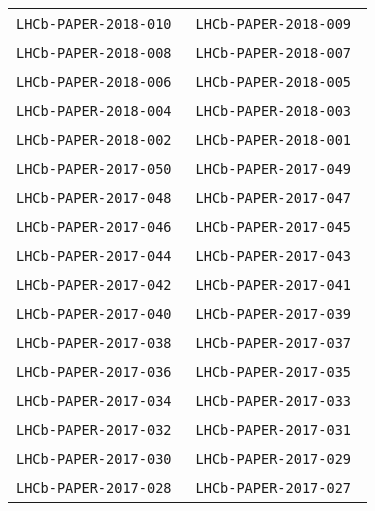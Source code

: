 \begin{center}
\begin{longtable}{ll}
\texttt{LHCb-PAPER-2018-010}~\cite{LHCb-PAPER-2018-010}  &
\texttt{LHCb-PAPER-2018-009}~\cite{LHCb-PAPER-2018-009} \\
\texttt{LHCb-PAPER-2018-008}~\cite{LHCb-PAPER-2018-008}  &
\texttt{LHCb-PAPER-2018-007}~\cite{LHCb-PAPER-2018-007} \\
\texttt{LHCb-PAPER-2018-006}~\cite{LHCb-PAPER-2018-006}  &
\texttt{LHCb-PAPER-2018-005}~\cite{LHCb-PAPER-2018-005} \\
\texttt{LHCb-PAPER-2018-004}~\cite{LHCb-PAPER-2018-004} &
\texttt{LHCb-PAPER-2018-003}~\cite{LHCb-PAPER-2018-003} \\
\texttt{LHCb-PAPER-2018-002}~\cite{LHCb-PAPER-2018-002} &
\texttt{LHCb-PAPER-2018-001}~\cite{LHCb-PAPER-2018-001} \\
\hline
\texttt{LHCb-PAPER-2017-050}~\cite{LHCb-PAPER-2017-050} &
\texttt{LHCb-PAPER-2017-049}~\cite{LHCb-PAPER-2017-049} \\
\texttt{LHCb-PAPER-2017-048}~\cite{LHCb-PAPER-2017-048} &
\texttt{LHCb-PAPER-2017-047}~\cite{LHCb-PAPER-2017-047} \\
\texttt{LHCb-PAPER-2017-046}~\cite{LHCb-PAPER-2017-046} &
\texttt{LHCb-PAPER-2017-045}~\cite{LHCb-PAPER-2017-045} \\
\texttt{LHCb-PAPER-2017-044}~\cite{LHCb-PAPER-2017-044} &
\texttt{LHCb-PAPER-2017-043}~\cite{LHCb-PAPER-2017-043} \\
\texttt{LHCb-PAPER-2017-042}~\cite{LHCb-PAPER-2017-042} &
\texttt{LHCb-PAPER-2017-041}~\cite{LHCb-PAPER-2017-041} \\
\texttt{LHCb-PAPER-2017-040}~\cite{LHCb-PAPER-2017-040} &
\texttt{LHCb-PAPER-2017-039}~\cite{LHCb-PAPER-2017-039} \\
\texttt{LHCb-PAPER-2017-038}~\cite{LHCb-PAPER-2017-038} &
\texttt{LHCb-PAPER-2017-037}~\cite{LHCb-PAPER-2017-037} \\
\texttt{LHCb-PAPER-2017-036}~\cite{LHCb-PAPER-2017-036} &
\texttt{LHCb-PAPER-2017-035}~\cite{LHCb-PAPER-2017-035} \\
\texttt{LHCb-PAPER-2017-034}~\cite{LHCb-PAPER-2017-034} &
\texttt{LHCb-PAPER-2017-033}~\cite{LHCb-PAPER-2017-033} \\
\texttt{LHCb-PAPER-2017-032}~\cite{LHCb-PAPER-2017-032} &
\texttt{LHCb-PAPER-2017-031}~\cite{LHCb-PAPER-2017-031} \\
\texttt{LHCb-PAPER-2017-030}~\cite{LHCb-PAPER-2017-030} &
\texttt{LHCb-PAPER-2017-029}~\cite{LHCb-PAPER-2017-029} \\
\texttt{LHCb-PAPER-2017-028}~\cite{LHCb-PAPER-2017-028} &
\texttt{LHCb-PAPER-2017-027}~\cite{LHCb-PAPER-2017-027} \\

\end{longtable}
\end{center}
